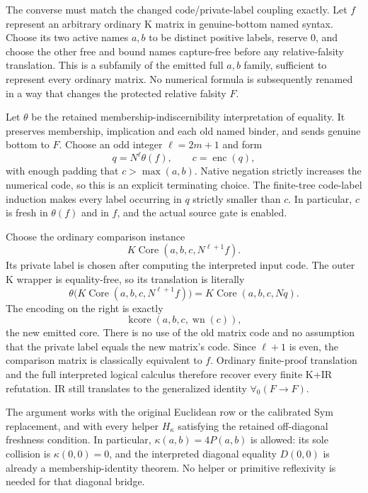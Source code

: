 The converse must match the changed code/private-label coupling exactly.
Let $f$ represent an arbitrary ordinary K matrix in genuine-bottom named
syntax.  Choose its two active names $a,b$ to be distinct positive labels,
reserve $0$, and choose the other free and bound names capture-free before
any relative-falsity translation.  This is a subfamily of the emitted full
$a,b$ family, sufficient to represent every ordinary matrix.  No numerical
formula is subsequently renamed in a way that changes the protected
relative falsity $F$.

Let $\theta$ be the retained membership-indiscernibility interpretation
of equality.  It preserves membership, implication and each old named
binder, and sends genuine bottom to $F$.  Choose an odd integer
$\ell=2m+1$ and form
\[
       q=N^{\ell}\theta(f),\qquad c=\operatorname{enc}(q),
\]
with enough padding that $c>\max(a,b)$.  Native negation strictly
increases the numerical code, so this is an explicit terminating choice.
The finite-tree code-label induction makes every label occurring in $q$
strictly smaller than $c$.  In particular, $c$ is fresh in $\theta(f)$
and in $f$, and the actual source gate is enabled.

Choose the ordinary comparison instance
\[
              K\operatorname{Core}(a,b,c,N^{\ell+1}f).
\]
Its private label is chosen after computing the interpreted input code.
The outer K wrapper is equality-free, so its translation is literally
\[
 \theta\bigl(K\operatorname{Core}(a,b,c,N^{\ell+1}f)\bigr)
 =K\operatorname{Core}(a,b,c,Nq).
\]
The encoding on the right is exactly
\[
                 \operatorname{kcore}(a,b,c,\operatorname{wn}(c)),
\]
the new emitted core.  There is no use of the old matrix code and no
assumption that the private label equals the new matrix's code.
Since $\ell+1$ is even, the comparison matrix is classically equivalent
to $f$.  Ordinary finite-proof translation and the full interpreted
logical calculus therefore recover every finite K+IR refutation.  IR
still translates to the generalized identity $\forall_0(F\to F)$.

The argument works with the original Euclidean row or the calibrated Sym
replacement, and with every helper $H_\kappa$ satisfying the retained
off-diagonal freshness condition.  In particular,
$\kappa(a,b)=4P(a,b)$ is allowed: its sole collision is
$\kappa(0,0)=0$, and the interpreted diagonal equality $D(0,0)$ is already
a membership-identity theorem.  No helper or primitive reflexivity is
needed for that diagonal bridge.

